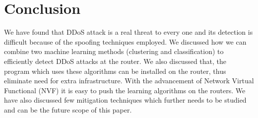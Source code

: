 \documentclass[12pt,oneside,a4paper]{article}
\begin{document}
\section{Conclusion}
We have found that DDoS attack is a real threat to every one and its detection is difficult because of the spoofing techniques employed. We discussed how we can combine two machine learning methods (clustering and classification) to efficiently detect DDoS attacks at the router. We also discussed that, the program which uses these algorithms can be installed on the router, thus eliminate need for extra infrastructure. With the advancement of Network Virtual Functional (NVF) it is easy to push the learning algorithms on the routers. We have also discussed few mitigation techniques which further needs to be studied and can be the future scope of this paper.

\pagebreak

\singlespacing
\end{document}
